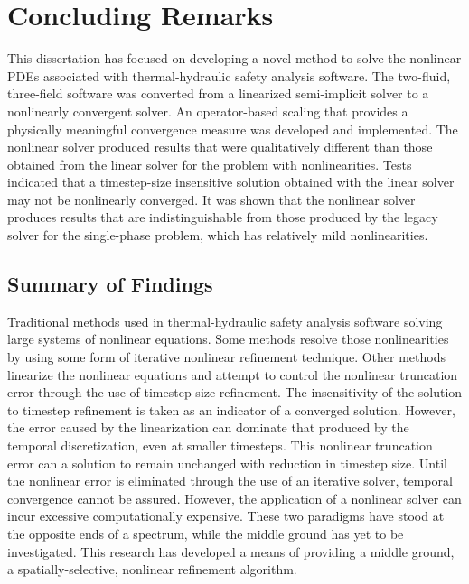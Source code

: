 \chapter{Concluding Remarks}
\label{chap:end}
This dissertation has focused on developing a novel method to solve the nonlinear PDEs associated with thermal-hydraulic safety analysis software.
The two-fluid, three-field software \cobra{} was converted from a linearized semi-implicit solver to a nonlinearly convergent solver.
An operator-based scaling that provides a physically meaningful convergence measure was developed and implemented.
The nonlinear solver produced results that were qualitatively different than those obtained from the linear solver for the problem with nonlinearities.
Tests indicated that a timestep-size insensitive solution obtained with the linear solver may not be nonlinearly converged.
It was shown that the nonlinear solver produces results that are indistinguishable from those produced by the legacy solver for the single-phase problem, which has relatively mild nonlinearities.

\section{Summary of Findings}
\label{sect:end:summary}
Traditional methods used in thermal-hydraulic safety analysis software solving large systems of nonlinear equations.
Some methods resolve those nonlinearities by using some form of iterative nonlinear refinement technique.
Other methods linearize the nonlinear equations and attempt to control the nonlinear truncation error through the use of timestep size refinement.
The insensitivity of the solution to timestep refinement is taken as an indicator of a converged solution. 
However, the error caused by the linearization can dominate that produced by the temporal discretization, even at smaller timesteps.
This nonlinear truncation error can a solution to remain unchanged with reduction in timestep size.
Until the nonlinear error is eliminated through the use of an iterative solver, temporal convergence cannot be assured.
However, the application of a nonlinear solver can incur excessive computationally expensive.
These two paradigms have stood at the opposite ends of a spectrum, while the middle ground has yet to be investigated.
This research has developed a means of providing a middle ground, a spatially-selective, nonlinear refinement algorithm.

